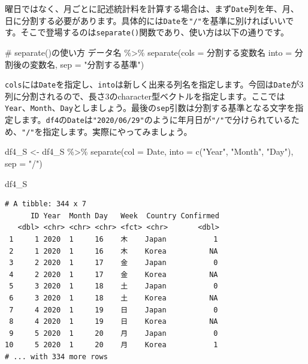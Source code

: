 \documentclass[
  a4paper,
  pandoc,
  ja=standard,
  jafont=haranoaji]{bxjsbook}
\newenvironment{Shaded}{\begin{snugshade}}{\end{snugshade}}
\newcommand{\AttributeTok}[1]{\textcolor[rgb]{0.00,0.48,0.65}{#1}}
\newcommand{\CommentTok}[1]{\textcolor[rgb]{0.37,0.37,0.37}{#1}}
\newcommand{\FunctionTok}[1]{\textcolor[rgb]{0.28,0.35,0.67}{#1}}
\newcommand{\NormalTok}[1]{\textcolor[rgb]{0.00,0.48,0.65}{#1}}
\newcommand{\OtherTok}[1]{\textcolor[rgb]{0.00,0.48,0.65}{#1}}
\newcommand{\SpecialCharTok}[1]{\textcolor[rgb]{0.37,0.37,0.37}{#1}}
\newcommand{\StringTok}[1]{\textcolor[rgb]{0.13,0.47,0.30}{#1}}
\begin{document}
曜日ではなく、月ごとに記述統計料を計算する場合は、まず\texttt{Date}列を年、月、日に分割する必要があります。具体的には\texttt{Date}を\texttt{"/"}を基準に別ければいいです。そこで登場するのは\texttt{separate()}関数であり、使い方は以下の通りです。

\begin{Shaded}
\begin{Highlighting}[numbers=left,,]
\CommentTok{\# separate()の使い方}
\NormalTok{データ名 }\SpecialCharTok{\%\textgreater{}\%}
  \FunctionTok{separate}\NormalTok{(}\AttributeTok{cols =}\NormalTok{ 分割する変数名}
           \AttributeTok{into =}\NormalTok{ 分割後の変数名,}
           \AttributeTok{sep  =} \StringTok{"分割する基準"}\NormalTok{)}
\end{Highlighting}
\end{Shaded}

\texttt{cols}には\texttt{Date}を指定し、\texttt{into}は新しく出来る列名を指定します。今回は\texttt{Date}が3列に分割されるので、長さ3のcharacter型ベクトルを指定します。ここでは\texttt{Year}、\texttt{Month}、\texttt{Day}としましょう。最後の\texttt{sep}引数は分割する基準となる文字を指定します。\texttt{df4}の\texttt{Date}は\texttt{"2020/06/29"}のように年月日が\texttt{"/"}で分けられているため、\texttt{"/"}を指定します。実際にやってみましょう。

\begin{Shaded}
\begin{Highlighting}[numbers=left,,]
\NormalTok{df4\_S }\OtherTok{\textless{}{-}}\NormalTok{ df4\_S }\SpecialCharTok{\%\textgreater{}\%}
  \FunctionTok{separate}\NormalTok{(}\AttributeTok{col =}\NormalTok{ Date, }\AttributeTok{into =} \FunctionTok{c}\NormalTok{(}\StringTok{"Year"}\NormalTok{, }\StringTok{"Month"}\NormalTok{, }\StringTok{"Day"}\NormalTok{), }\AttributeTok{sep =} \StringTok{"/"}\NormalTok{)}

\NormalTok{df4\_S}
\end{Highlighting}
\end{Shaded}

\begin{verbatim}
# A tibble: 344 x 7
      ID Year  Month Day   Week  Country Confirmed
   <dbl> <chr> <chr> <chr> <fct> <chr>       <dbl>
 1     1 2020  1     16    木    Japan           1
 2     1 2020  1     16    木    Korea          NA
 3     2 2020  1     17    金    Japan           0
 4     2 2020  1     17    金    Korea          NA
 5     3 2020  1     18    土    Japan           0
 6     3 2020  1     18    土    Korea          NA
 7     4 2020  1     19    日    Japan           0
 8     4 2020  1     19    日    Korea          NA
 9     5 2020  1     20    月    Japan           0
10     5 2020  1     20    月    Korea           1
# ... with 334 more rows
\end{verbatim}
\end{document}
